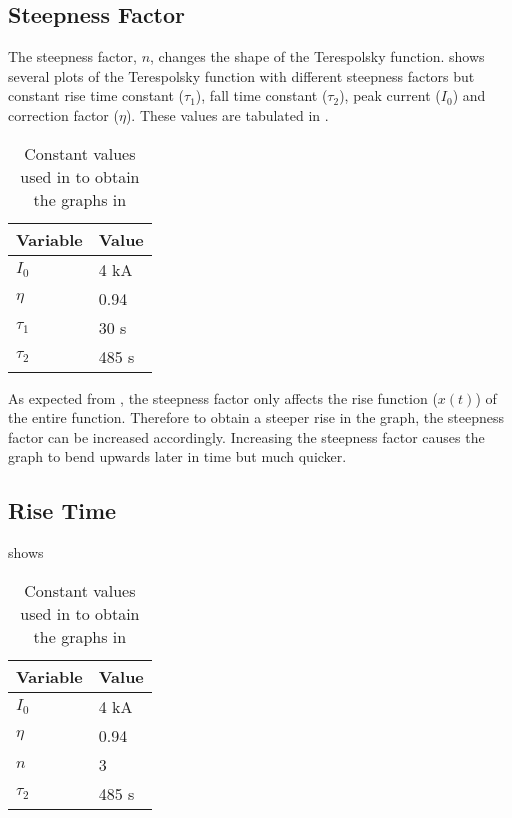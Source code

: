 \subsection{Steepness Factor}
\label{sub:steepness_factor}

The steepness factor, $n$, changes the shape of the Terespolsky function.  shows several plots of the Terespolsky function with different steepness factors but constant rise time constant ($\tau_1$), fall time constant ($\tau_2$), peak current ($I_0$) and correction factor ($\eta$). These values are tabulated in .
\begin{table}[htbp]
	\centering
	\caption{Constant values used in  to obtain the graphs in }
	\begin{tabular}{ll}
		\textbf{Variable} & \textbf{Value} \\
		\hline
		$I_0$ & 4 kA \\
		$\eta$ & 0.94 \\
		$\tau_1$ & 30 \micro s \\
		$\tau_2$ & 485 \micro s
	\end{tabular}
	\label{tab:TFConstsSteep}
\end{table}

As expected from , the steepness factor only affects the rise function ($x(t)$) of the entire function. Therefore to obtain a steeper rise in the graph, the steepness factor can be increased accordingly. Increasing the steepness factor causes the graph to bend upwards later in time but much quicker.

\subsection{Rise Time}
\label{sub:rise_time}

 shows
\begin{table}[htbp]
	\centering
	\caption{Constant values used in  to obtain the graphs in }
	\begin{tabular}{ll}
		\textbf{Variable} & \textbf{Value} \\
		\hline
		$I_0$ & 4 kA \\
		$\eta$ & 0.94 \\
		$n$ & 3 \\
		$\tau_2$ & 485 \micro s
	\end{tabular}
	\label{tab:TFConstsRise}
\end{table}

